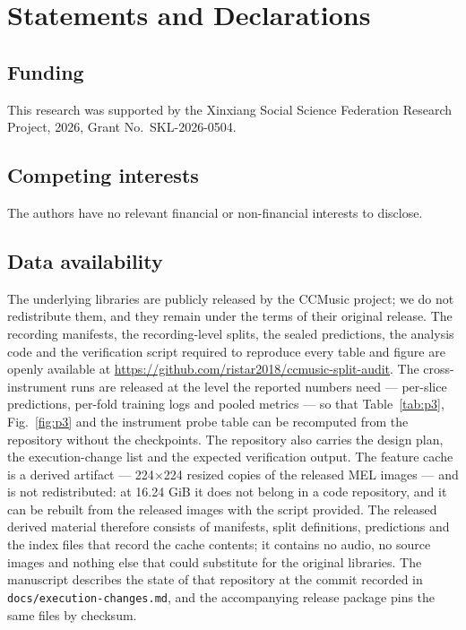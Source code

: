 \section*{Statements and Declarations}

\subsection*{Funding}

This research was supported by the Xinxiang Social Science Federation Research Project, 2026,
Grant No.\ SKL-2026-0504.

\subsection*{Competing interests}

The authors have no relevant financial or non-financial interests to disclose.

\subsection*{Data availability}

The underlying libraries are publicly released by the CCMusic project; we do not redistribute
them, and they remain under the terms of their original release. The recording manifests, the
recording-level splits, the sealed predictions, the analysis
code and the verification script required to reproduce every table and figure are openly
available at \url{https://github.com/ristar2018/ccmusic-split-audit}. The cross-instrument runs
are released at the level the reported numbers need --- per-slice predictions, per-fold training
logs and pooled metrics --- so that Table~\ref{tab:p3}, Fig.~\ref{fig:p3} and the instrument
probe table can be recomputed from the repository without the checkpoints. The repository also
carries
the design plan, the execution-change list and the expected verification output. The feature cache is a derived artifact --- 224$\times$224 resized copies of the released MEL
images --- and is not redistributed: at 16.24 GiB it does not belong in a code repository, and
it can be rebuilt from the released images with the script provided. The
released derived material therefore consists of manifests, split definitions, predictions and
the index files that record the cache contents; it contains no audio, no source images and
nothing else that could substitute for the original libraries. The manuscript describes the state of that repository at
the commit recorded in \texttt{docs/execution-changes.md}, and the accompanying release package
pins the same files by checksum.

